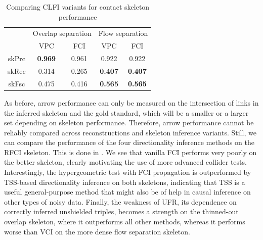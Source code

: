 \begin{table}
 \centering
 \begin{tabular}{ccccc}
  \hline \hline
   & \multicolumn{2}{l}{Overlap separation} & \multicolumn{2}{l}{Flow separation}\\ 
   & VPC & FCI & VPC & FCI\\ 
  \hline
  skPrc & \textbf{0.969} & 0.961 & 0.922 & 0.922\\
  skRec & 0.314 & 0.265 & \textbf{0.407} & \textbf{0.407}\\
  skFsc & 0.475 & 0.416 & \textbf{0.565} & \textbf{0.565}\\
  \hline
 \end{tabular}
 \caption{Comparing CLFI variants for contact skeleton performance}
 \label{contact-skeleton-evaluation-nelex}
\end{table}

As before, arrow performance can only be measured on the intersection of links in the inferred skeleton and the gold standard, which will be a smaller or a larger set depending on skeleton performance. Therefore, arrow performance cannot be reliably compared across reconstructions and skeleton inference variants. Still, we can compare the performance of the four directionality inference methods on the RFCI skeleton. This is done in . We see that vanilla FCI performs very poorly on the better skeleton, clearly motivating the use of more advanced collider tests. Interestingly, the hypergeometric test with FCI propagation is outperformed by TSS-based directionality inference on both skeletons, indicating that TSS is a useful general-purpose method that might also be of help in causal inference on other types of noisy data. Finally, the weakness of UFR, its dependence on correctly inferred unshielded triples, becomes a strength on the thinned-out overlap skeleton, 
where it outperforms all other methods, whereas it performs worse than VCI on the more dense flow separation skeleton.

